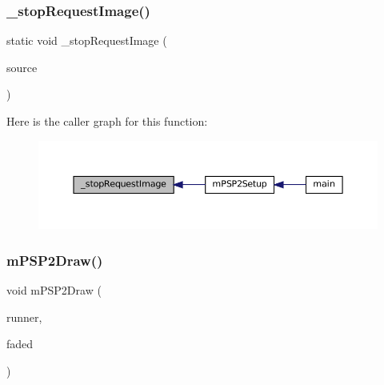 \subsubsection{\texorpdfstring{\+\_\+stop\+Request\+Image()}{\_stopRequestImage()}}
{\footnotesize\ttfamily static void \+\_\+stop\+Request\+Image (\begin{DoxyParamCaption}\item[{struct m\+Image\+Source $\ast$}]{source }\end{DoxyParamCaption})\hspace{0.3cm}{\ttfamily [static]}}

Here is the caller graph for this function\+:
\nopagebreak
\begin{figure}[H]
\begin{center}
\leavevmode
\includegraphics[width=350pt]{psp2-context_8c_af947cb220342f189826b8c971201d59b_icgraph}
\end{center}
\end{figure}
\mbox{\label{psp2-context_8c_ac47f4c33aec2cd84a2236b2686d1ffbe}} 
\subsubsection{\texorpdfstring{m\+P\+S\+P2\+Draw()}{mPSP2Draw()}}
{\footnotesize\ttfamily void m\+P\+S\+P2\+Draw (\begin{DoxyParamCaption}\item[{struct \mbox{\hyperlink{structm_g_u_i_runner}{m\+G\+U\+I\+Runner}} $\ast$}]{runner,  }\item[{\mbox{\hyperlink{libretro_8h_a4a26dcae73fb7e1528214a068aca317e}{bool}}}]{faded }\end{DoxyParamCaption})}

